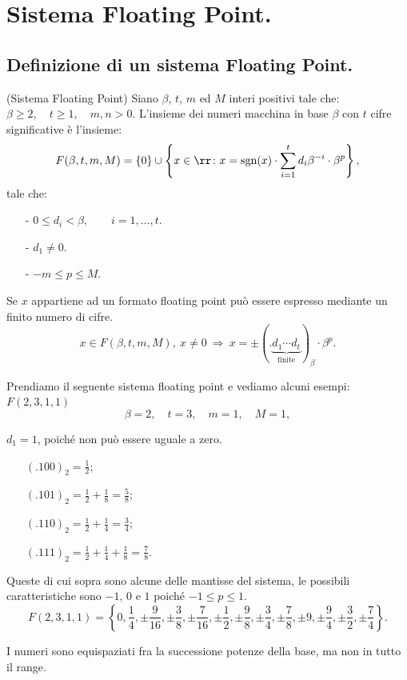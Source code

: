 

\chapter{Sistema Floating Point.}

\section{Definizione di un sistema Floating Point.}
\begin{defi}(Sistema Floating Point)
Siano $\beta$, $t$, $m$ ed $M$ interi positivi tale che:
$\beta \geq 2, \quad t \geq 1, \quad m,n > 0.$ L'insieme dei numeri macchina
in base $\beta$ con $t$ cifre significative è l'insieme:
\[F(\beta, t, m, M) = \{0\} \cup \left\{x \in \rr \colon x = \textrm{sgn}(x)
\cdot \sum_{i = 1}^{t}d_i\beta^{-i}\cdot \beta^p\right\},\]
tale che:
\begin{itemize}
\item[-]$0 \leq d_i < \beta, \qquad i = 1, \ldots, t.$
\item[-]$d_1 \neq 0.$
\item[-]$-m \leq p \leq M$.
\end{itemize}
\end{defi}

\begin{osse}Se $x$ appartiene ad un formato floating point può essere
espresso mediante un finito numero di cifre.
\[x \in F(\beta, t, m, M), \ x \neq 0 \ \Rightarrow \ x = \pm (.
\underbrace{d_1\cdots d_t}_{\textrm{finite}}
)_{\beta}\cdot \beta^p.\]
\end{osse}

\begin{exe}
Prendiamo il seguente sistema floating point e vediamo alcuni esempi:\\

$F(2,3,1,1)$
\[\beta = 2, \quad t = 3, \quad m = 1, \quad M = 1,\]

$d_1 = 1$, poiché non può essere uguale a zero.
\begin{itemize}
\item[]$(.100)_2 = \frac{1}{2}$;
\item[]$(.101)_2 = \frac{1}{2} + \frac{1}{8} = \frac{5}{8}$;
\item[]$(.110)_2 = \frac{1}{2} + \frac{1}{4} = \frac{3}{4}$;
\item[]$(.111)_2 = \frac{1}{2} + \frac{1}{4} + \frac{1}{8} = \frac{7}{8}$.
\end{itemize}
Queste di cui sopra sono alcune delle mantisse del sistema, le possibili
caratteristiche sono $-1$, $0$ e $1$ poiché $-1 \leq p \leq 1$.
\[F(2,3,1,1) = \left\{0, \frac{1}{4}, \pm\frac{9}{16}, \pm\frac{3}{8}, 
\pm\frac{7}{16}, \pm\frac{1}{2}, \pm\frac{9}{8}, \pm\frac{3}{4}, 
\pm\frac{7}{8}, \pm 9, \pm\frac{9}{4}, \pm\frac{3}{2}, \pm\frac{7}{4}
\right\}.
\]
\end{exe}
I numeri sono equispaziati fra la successione potenze della base, ma non in 
tutto il range.


